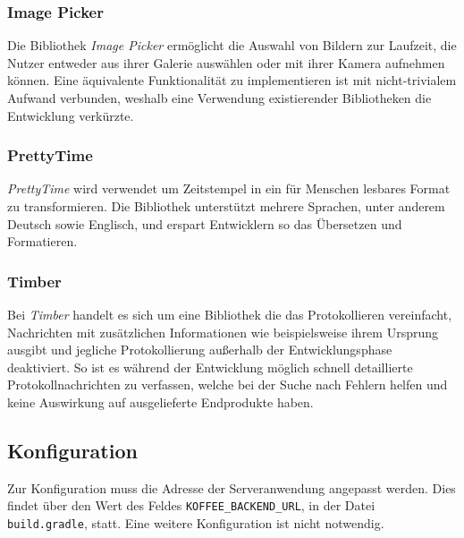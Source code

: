 \subsubsection{Image Picker}
\label{subsubsec:app:bibs:imagepicker}
Die Bibliothek \textit{Image Picker} ermöglicht die Auswahl von Bildern zur Laufzeit, die Nutzer entweder aus ihrer Galerie auswählen oder mit ihrer Kamera aufnehmen können.
Eine äquivalente Funktionalität zu implementieren ist mit nicht-trivialem Aufwand verbunden, weshalb eine Verwendung existierender Bibliotheken die Entwicklung verkürzte.

\subsubsection{PrettyTime}
\label{subsubsec:app:bibs:prettytime}
\textit{PrettyTime} wird verwendet um Zeitstempel in ein für Menschen lesbares Format zu transformieren.
Die Bibliothek unterstützt mehrere Sprachen, unter anderem Deutsch sowie Englisch, und erspart Entwicklern so das Übersetzen und Formatieren.

\subsubsection{Timber}
\label{subsubsec:app:bibs:timber}
Bei \textit{Timber} handelt es sich um eine Bibliothek die das Protokollieren vereinfacht, Nachrichten mit zusätzlichen Informationen wie beispielsweise ihrem Ursprung ausgibt und jegliche Protokollierung außerhalb der Entwicklungsphase deaktiviert.
So ist es während der Entwicklung möglich schnell detaillierte Protokollnachrichten zu verfassen, welche bei der Suche nach Fehlern helfen und keine Auswirkung auf ausgelieferte Endprodukte haben.

\subsection{Konfiguration}
\label{subsec:app:configuration}
Zur Konfiguration muss die Adresse der Serveranwendung angepasst werden.
Dies findet über den Wert des Feldes \verb|KOFFEE_BACKEND_URL|, in der Datei \verb|build.gradle|, statt.
Eine weitere Konfiguration ist nicht notwendig.

